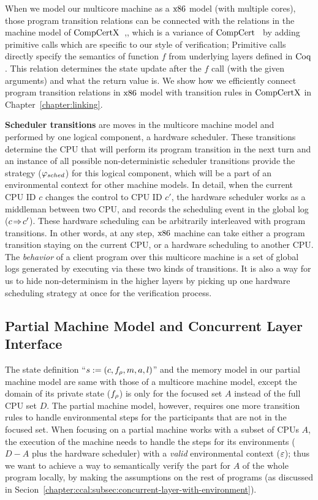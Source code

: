 When we model our multicore machine as a $\mathrm{x86}$ model (with multiple cores),
those program transition relations can be connected with the relations 
in the machine model of $\mathrm{CompCertX}$~\cite{deepspec},, 
which is a variance of $\mathrm{CompCert}$~\cite{leroy09}
by adding primitive calls which are specific to our style of verification;
Primitive calls directly specify the semantics of function $f$ from underlying layers defined in $\mathrm{Coq}$. 
This relation determines the state update after the $f$ call (with the given arguments) and what the return value is.
We show how we efficiently connect program transition relations in 
$\mathrm{x86}$ model with transition rules in $\mathrm{CompCertX}$ in Chapter~\ref{chapter:linking}.

\textbf{Scheduler transitions} are moves in the multicore machine model and performed by one logical component, a hardware scheduler.
 These transitions determine  the CPU that will perform its program transition 
in the next turn and 
an instance of all possible non-deterministic scheduler transitions provide 
the strategy   ($\varphi_{sched}$) for this logical component, 
which will be a part of an environmental context for other machine models. 
In detail, when the current CPU ID $c$ changes
the control to CPU ID $c'$,
the hardware scheduler works as a
middleman between 
two CPU, and records the scheduling event 
in the global log ($c \!\Rightarrow\! c'$).
These hardware scheduling
can be arbitrarily interleaved with
program transitions.
In other words, at any step,
$\mathrm{x86}$ machine can take either a program transition staying
on the current CPU,
or a hardware scheduling to another CPU.
The \emph{behavior} of a client program  over this multicore machine is a set of global logs generated by executing  via these two kinds of transitions.
It is also a way for us to hide non-determinism in the higher layers
by picking up 
one hardware scheduling strategy at once for the verification process.




\subsection{Partial  Machine Model and Concurrent Layer Interface}
\label{chapter:ccal:subsec:concurrent-layer-interface}


The state definition ``$s := (c, f_{\rho}, m, a, l)$'' and the memory model in our partial machine model are
same with those of a multicore machine model, 
except the domain of its private state ($f_{\rho}$) is only for the focused set $A$ instead of the full CPU set $D$.
The partial machine model, however, requires one more transition rules to handle environmental steps for the participants that are not in the focused set.
When focusing on a partial machine works with a subset of CPUs $A$,
the execution of the machine needs to handle 
the steps for its environments ($D - A$ plus the hardware scheduler) with a \textit{valid} environmental context (${\varepsilon}$);
thus we want to  achieve a way to semantically verify the part for $A$ of the whole program locally, 
by making the assumptions on the rest of programs (as discussed in Secion~\ref{chapter:ccal:subsec:concurrent-layer-with-environment}).


